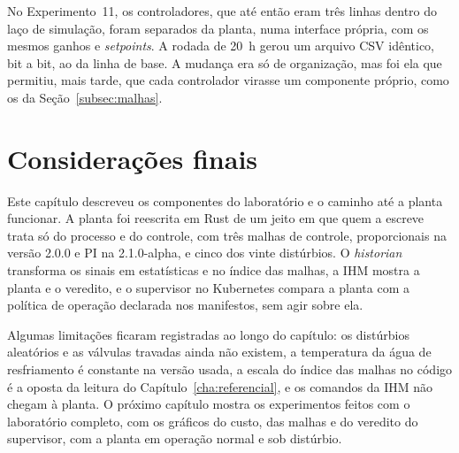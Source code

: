 No Experimento~11, os controladores, que até então eram três linhas dentro do laço de simulação, foram separados da planta, numa interface própria, com os mesmos ganhos e \textit{setpoints}. A rodada de 20~h gerou um arquivo CSV idêntico, bit a bit, ao da linha de base. A mudança era só de organização, mas foi ela que permitiu, mais tarde, que cada controlador virasse um componente próprio, como os da Seção~\ref{subsec:malhas}.

\section{Considerações finais}
\label{sec:dev_conclusao}

Este capítulo descreveu os componentes do laboratório e o caminho até a planta funcionar. A planta foi reescrita em Rust de um jeito em que quem a escreve trata só do processo e do controle, com três malhas de controle, proporcionais na versão 2.0.0 e PI na 2.1.0-alpha, e cinco dos vinte distúrbios. O \textit{historian} transforma os sinais em estatísticas e no índice das malhas, a IHM mostra a planta e o veredito, e o supervisor no Kubernetes compara a planta com a política de operação declarada nos manifestos, sem agir sobre ela.

Algumas limitações ficaram registradas ao longo do capítulo: os distúrbios aleatórios e as válvulas travadas ainda não existem, a temperatura da água de resfriamento é constante na versão usada, a escala do índice das malhas no código é a oposta da leitura do Capítulo~\ref{cha:referencial}, e os comandos da IHM não chegam à planta. O próximo capítulo mostra os experimentos feitos com o laboratório completo, com os gráficos do custo, das malhas e do veredito do supervisor, com a planta em operação normal e sob distúrbio.
